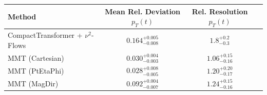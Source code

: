     \begin{tabular}{lccc}
        \toprule
        Method & Mean Rel. Deviation $p_{T}(t)$ & Rel. Resolution $p_{T}(t)$ \\
        \midrule
        CompactTransformer + $\nu^2$-Flows & $0.164^{+0.005}_{-0.008}$ & $1.8^{+0.2}_{-0.3}$ \\
        MMT (Cartesian) & $0.030^{+0.004}_{-0.003}$ & $1.06^{+0.15}_{-0.16}$ \\
        MMT (PtEtaPhi) & $0.028^{+0.008}_{-0.005}$ & $1.20^{+0.20}_{-0.17}$ \\
        MMT (MagDir) & $0.092^{+0.004}_{-0.007}$ & $1.24^{+0.15}_{-0.16}$ \\
        \bottomrule
    \end{tabular}